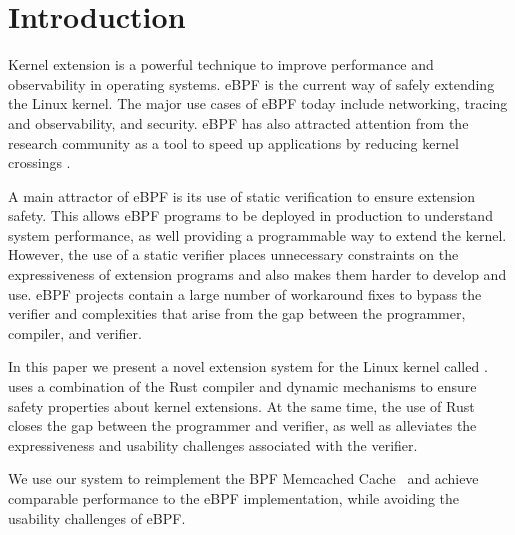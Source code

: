 \section{Introduction}

Kernel extension is a powerful technique to improve performance and
    observability in operating systems.
eBPF is the current way of safely extending the Linux kernel.
The major use cases of eBPF today include networking, tracing and
    observability, and security.
eBPF has also attracted attention from the research community as
    a tool to speed up applications by reducing kernel crossings \cite{BMC,Electrode,bpfxrp}.

A main attractor of eBPF is its use of static verification to ensure extension safety.
This allows eBPF programs to be deployed in production to understand system performance,
    as well providing a programmable way to extend the kernel.
However, the use of a static verifier places unnecessary constraints on the expressiveness
    of extension programs and also makes them harder to develop and use.
eBPF projects contain a large number of workaround fixes to bypass the verifier and
    complexities that arise from the gap between the programmer, compiler, and verifier.

In this paper we present a novel extension system for the Linux kernel called \projname{}.
\projname{} uses a combination of the Rust compiler and dynamic mechanisms
    to ensure safety properties about kernel extensions.
At the same time, the use of Rust closes the gap between the programmer and verifier,
    as well as alleviates the expressiveness and usability challenges associated with
    the verifier.

We use our system to reimplement the BPF Memcached Cache~\cite{BMC} and achieve
    comparable performance to the eBPF implementation, while avoiding the
    usability challenges of eBPF.


